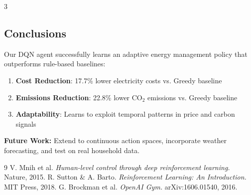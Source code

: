 \documentclass[a0,portrait]{a0poster}
\begin{document}
\begin{multicols}{3}

\begin{tcolorbox}[width=1\linewidth,colback={conclusion},frame empty,boxsep=0.6cm, arc=10pt]
\section{Conclusions}

Our DQN agent successfully learns an adaptive energy management policy that outperforms rule-based baselines:

\begin{enumerate}
    \item \textbf{Cost Reduction}: 17.7\% lower electricity costs vs. Greedy baseline
    \item \textbf{Emissions Reduction}: 22.8\% lower CO$_2$ emissions vs. Greedy baseline
    \item \textbf{Adaptability}: Learns to exploit temporal patterns in price and carbon signals
\end{enumerate}

\textbf{Future Work:} Extend to continuous action spaces, incorporate weather forecasting, and test on real household data.
\end{tcolorbox}


\singlespacing
\footnotesize
\begin{thebibliography}{9}
 V. Mnih et al. \textit{Human-level control through deep reinforcement learning.} Nature, 2015.
 R. Sutton \& A. Barto. \textit{Reinforcement Learning: An Introduction.} MIT Press, 2018.
 G. Brockman et al. \textit{OpenAI Gym.} arXiv:1606.01540, 2016.
\end{thebibliography}

\end{multicols}
\end{document}
